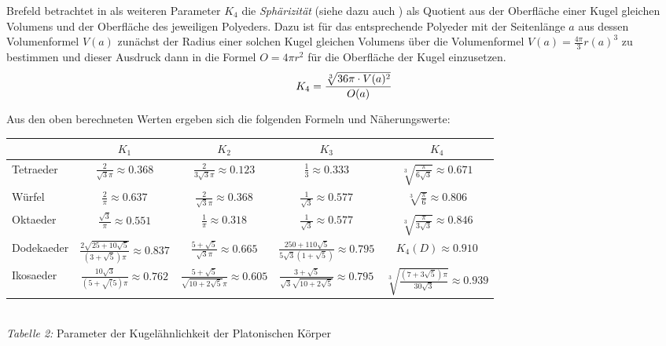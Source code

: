 \documentclass[11pt]{article}
\begin{document}
Brefeld betrachtet in \cite{Brefeld} als weiteren Parameter $K_4$ die
\emph{Sphärizität} (siehe dazu auch \cite{Sphaer}) als Quotient aus der
Oberfläche einer Kugel gleichen Volumens und der Oberfläche des jeweiligen
Polyeders.  Dazu ist für das entsprechende Polyeder mit der Seitenlänge $a$
aus dessen Volumenformel $V(a)$ zunächst der Radius einer solchen Kugel
gleichen Volumens über die Volumenformel $V(a)=\frac{4\pi}{3}r(a)^3$ zu
bestimmen und dieser Ausdruck dann in die Formel $O=4\pi r^2$ für die
Oberfläche der Kugel einzusetzen.
\begin{gather*}
  K_4=\frac{\sqrt[3]{36\pi\cdot V(a)^2}}{O(a)}
\end{gather*}

Aus den oben berechneten Werten ergeben sich die folgenden Formeln und
Näherungswerte:

\begin{center}\small
  \begin{tabular}{|l|c|c|c|c|}\hline
    & $K_1$ & $K_2$ & $K_3$ & $K_4$\\\hline

    \rule[-16pt]{0pt}{30pt}Tetraeder & $\frac{2}{\sqrt{3}\pi}\approx 0.368$ &
    $\frac{2}{3\sqrt{3}\pi}\approx 0.123$ & $\frac13\approx 0.333$ &
    $\sqrt[3]{\frac{\pi}{6\sqrt{3}}}\approx 0.671$\\
    
    \rule[-16pt]{0pt}{16pt}Würfel & $\frac{2}{\pi}\approx 0.637$ &
    $\frac{2}{\sqrt{3}\pi}\approx 0.368$ & $\frac{1}{\sqrt{3}}\approx 0.577$ &
    $\sqrt[3]{\frac{\pi}{6}}\approx 0.806$\\

    \rule[-16pt]{0pt}{16pt}Oktaeder & $\frac{\sqrt{3}}{\pi}\approx 0.551$ &
    $\frac{1}{\pi}\approx 0.318$ & $\frac{1}{\sqrt{3}}\approx 0.577$ &
    $\sqrt[3]{\frac{\pi}{3\sqrt{3}}}\approx 0.846$\\
    
    \rule[-16pt]{0pt}{16pt}Dodekaeder &
    $\frac{2\sqrt{25+10\sqrt{5}}}{(3+\sqrt{5})\pi}\approx 0.837$ &
    $\frac{5+\sqrt{5}}{\sqrt{3}\pi}\approx 0.665$ &
    $\frac{250+110\sqrt{5}}{5\sqrt{3}(1+\sqrt{5})}\approx 0.795$ &
    $K_4(D)\approx 0.910$\\
    
    \rule[-16pt]{0pt}{16pt}Ikosaeder &
    $\frac{10\sqrt{3}}{(5+\sqrt(5)\pi}\approx 0.762$ &
    $\frac{5+\sqrt{5}}{\sqrt{10+2\sqrt{5}}\pi}\approx 0.605$ &
    $\frac{3+\sqrt{5}}{\sqrt{3}\sqrt{10+2\sqrt{5}}}\approx 0.795$ & $
    \sqrt[3]{\frac{(7+3\sqrt{5})\pi}{30\sqrt{3}}}\approx 0.939 $\\\hline
  \end{tabular}\\[6pt]
  \emph{Tabelle 2:} Parameter der Kugelähnlichkeit der Platonischen Körper
\end{center}
\end{document}
